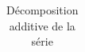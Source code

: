 \begin{table}[!h]
\centering
\caption{Décomposition additive de la série}
\centering
\begin{tabular}[t]{}
\toprule

\bottomrule
\end{tabular}
\end{table}
